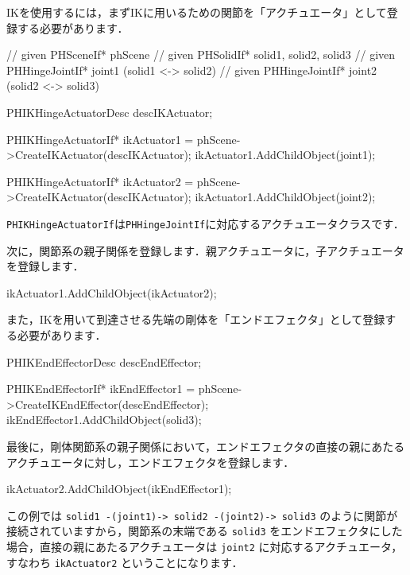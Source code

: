 \begin{center}
\end{center}


%
% 

IK\KLUDGE を使用するには，まずIK\KLUDGE に用いるための関節を「アクチュエータ」として登録する必要があります．
\begin{sourcecode}
// given PHSceneIf* phScene
// given PHSolidIf* solid1, solid2, solid3
// given PHHingeJointIf* joint1 (solid1 <-> solid2)
// given PHHingeJointIf* joint2 (solid2 <-> solid3)

PHIKHingeActuatorDesc descIKActuator;

PHIKHingeActuatorIf* ikActuator1
  = phScene->CreateIKActuator(descIKActuator);
ikActuator1.AddChildObject(joint1);

PHIKHingeActuatorIf* ikActuator2
  = phScene->CreateIKActuator(descIKActuator);
ikActuator1.AddChildObject(joint2);
\end{sourcecode}
\texttt{PHIKHingeActuatorIf}\KLUDGE は\texttt{PHHingeJointIf}\KLUDGE に対応するアクチュエータクラスです．


\KLUDGE 次に，関節系の親子関係を登録します．親アクチュエータに，子アクチュエータを登録します．
\begin{sourcecode}
ikActuator1.AddChildObject(ikActuator2);
\end{sourcecode}


\KLUDGE また，IK\KLUDGE を用いて到達させる先端の剛体を「エンドエフェクタ」として登録する必要があります．
\begin{sourcecode}
PHIKEndEffectorDesc descEndEffector;

PHIKEndEffectorIf* ikEndEffector1
  = phScene->CreateIKEndEffector(descEndEffector);
ikEndEffector1.AddChildObject(solid3);
\end{sourcecode}


\KLUDGE 最後に，剛体関節系の親子関係において，エンドエフェクタの直接の親にあたるアクチュエータに対し，エンドエフェクタを登録します．
\begin{sourcecode}
ikActuator2.AddChildObject(ikEndEffector1);
\end{sourcecode}
\KLUDGE この例では \texttt{solid1 -(joint1)-> solid2 -(joint2)-> solid3} \KLUDGE のように関節が接続されていますから，関節系の末端である \texttt{solid3} \KLUDGE をエンドエフェクタにした場合，直接の親にあたるアクチュエータは \texttt{joint2} \KLUDGE に対応するアクチュエータ，すなわち \texttt{ikActuator2} \KLUDGE ということになります．

